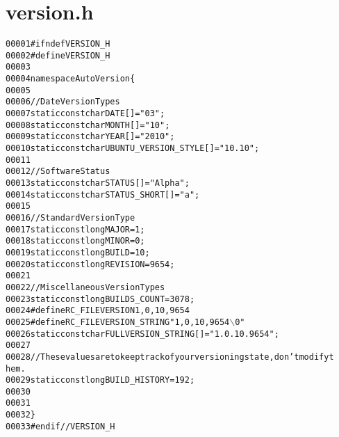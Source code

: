 \hypertarget{version_8h_source}{
\section{version.h}
}


\begin{footnotesize}\begin{alltt}
00001 \textcolor{preprocessor}{#ifndef VERSION\_H}
00002 \textcolor{preprocessor}{}\textcolor{preprocessor}{#define VERSION\_H}
00003 \textcolor{preprocessor}{}
00004 \textcolor{keyword}{namespace }AutoVersion\{
00005         
00006         \textcolor{comment}{//Date Version Types}
00007         \textcolor{keyword}{static} \textcolor{keyword}{const} \textcolor{keywordtype}{char} DATE[] = \textcolor{stringliteral}{"03"};
00008         \textcolor{keyword}{static} \textcolor{keyword}{const} \textcolor{keywordtype}{char} MONTH[] = \textcolor{stringliteral}{"10"};
00009         \textcolor{keyword}{static} \textcolor{keyword}{const} \textcolor{keywordtype}{char} YEAR[] = \textcolor{stringliteral}{"2010"};
00010         \textcolor{keyword}{static} \textcolor{keyword}{const} \textcolor{keywordtype}{char} UBUNTU\_VERSION\_STYLE[] = \textcolor{stringliteral}{"10.10"};
00011         
00012         \textcolor{comment}{//Software Status}
00013         \textcolor{keyword}{static} \textcolor{keyword}{const} \textcolor{keywordtype}{char} STATUS[] = \textcolor{stringliteral}{"Alpha"};
00014         \textcolor{keyword}{static} \textcolor{keyword}{const} \textcolor{keywordtype}{char} STATUS\_SHORT[] = \textcolor{stringliteral}{"a"};
00015         
00016         \textcolor{comment}{//Standard Version Type}
00017         \textcolor{keyword}{static} \textcolor{keyword}{const} \textcolor{keywordtype}{long} MAJOR = 1;
00018         \textcolor{keyword}{static} \textcolor{keyword}{const} \textcolor{keywordtype}{long} MINOR = 0;
00019         \textcolor{keyword}{static} \textcolor{keyword}{const} \textcolor{keywordtype}{long} BUILD = 10;
00020         \textcolor{keyword}{static} \textcolor{keyword}{const} \textcolor{keywordtype}{long} REVISION = 9654;
00021         
00022         \textcolor{comment}{//Miscellaneous Version Types}
00023         \textcolor{keyword}{static} \textcolor{keyword}{const} \textcolor{keywordtype}{long} BUILDS\_COUNT = 3078;
00024 \textcolor{preprocessor}{        #define RC\_FILEVERSION 1,0,10,9654}
00025 \textcolor{preprocessor}{}\textcolor{preprocessor}{        #define RC\_FILEVERSION\_STRING "1, 0, 10, 9654\(\backslash\)0"}
00026 \textcolor{preprocessor}{}        \textcolor{keyword}{static} \textcolor{keyword}{const} \textcolor{keywordtype}{char} FULLVERSION\_STRING[] = \textcolor{stringliteral}{"1.0.10.9654"};
00027         
00028         \textcolor{comment}{//These values are to keep track of your versioning state, don't modify t
      hem.}
00029         \textcolor{keyword}{static} \textcolor{keyword}{const} \textcolor{keywordtype}{long} BUILD\_HISTORY = 192;
00030         
00031 
00032 \}
00033 \textcolor{preprocessor}{#endif //VERSION\_H}
\end{alltt}\end{footnotesize}
